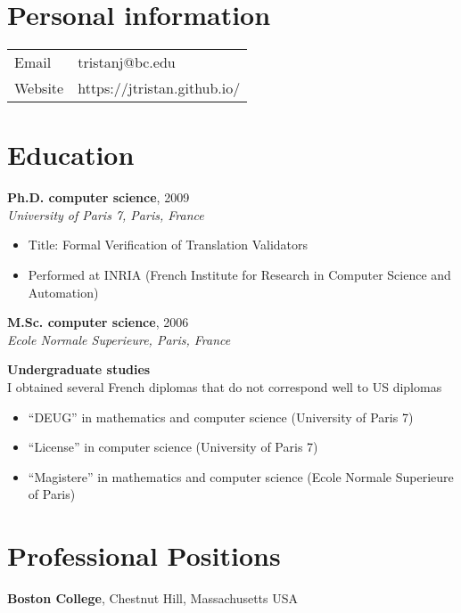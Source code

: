 \documentclass[margin,line]{res}
\begin{document}

\begin{resume}


\section{\sc Personal information}
\vspace{.05in}
\begin{tabular}{@{}p{2in}p{4in}}
  Email           & tristanj@bc.edu \\
  Website         & https://jtristan.github.io/ \\
\end{tabular}

\section{\sc Education}
{\bf Ph.D. computer science}, 2009\\
{\em University of Paris 7, Paris, France} 
\begin{itemize}
  \item Title: Formal Verification of Translation Validators
  \item Performed at INRIA (French Institute for Research in Computer Science and Automation)
\end{itemize}

{\bf M.Sc. computer science}, 2006\\
{\em Ecole Normale Superieure, Paris, France} 

{\bf Undergraduate studies}\\
I obtained several French diplomas that do not correspond well to US diplomas
\begin{itemize}
\item ``DEUG'' in mathematics and computer science (University of Paris 7)
\item ``License'' in computer science (University of Paris 7)
\item ``Magistere'' in mathematics and computer science (Ecole Normale Superieure of Paris)
\end{itemize}

\section{\sc Professional Positions}

{\bf Boston College}, Chestnut Hill, Massachusetts USA
\vspace{-.4cm}


\end{resume}
\end{document}
